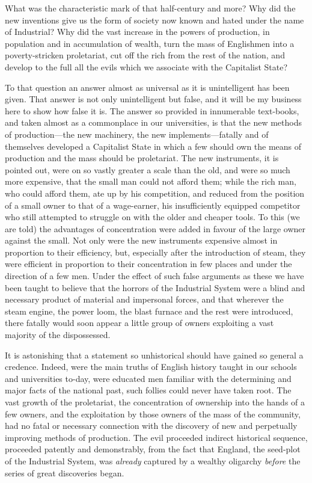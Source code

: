 \documentclass{book}
\begin{document}
What was the characteristic mark of that half-century and more? Why did the new inventions give us the form of society now known and hated under the name of Industrial? Why did the vast increase in the powers of production, in population and in accumulation of wealth, turn the mass of Englishmen into a poverty-stricken proletariat, cut off the rich from the rest of the nation, and develop to the full all the evils which we associate with the Capitalist State?

To that question an answer almost as universal as it is unintelligent has been given. That answer is not only unintelligent but false, and it will be my business here to show how false it is. The answer so provided in innumerable text-books, and taken almost as a commonplace in our universities, is that the new methods of production—the new machinery, the new implements—fatally and of themselves developed a Capitalist State in which a few should own the means of production and the mass should be proletariat. The new instruments, it is pointed out, were on so vastly greater a scale than the old, and were so much more expensive, that the small man could not afford them; while the rich man, who could afford them, ate up by his competition, and reduced from the position of a small owner to that of a wage-earner, his insufficiently equipped competitor who still attempted to struggle on with the older and cheaper tools. To this (we are told) the advantages of concentration were added in favour of the large owner against the small. Not only were the new instruments expensive almost in proportion to their efficiency, but, especially after the introduction of steam, they were efficient in proportion to their concentration in few places and under the direction of a few men. Under the effect of such false arguments as these we have been taught to believe that the horrors of the Industrial System were a blind and necessary product of material and impersonal forces, and that wherever the steam engine, the power loom, the blast furnace and the rest were introduced, there fatally would soon appear a little group of owners exploiting a vast majority of the dispossessed.

It is astonishing that a statement so unhistorical should have gained so general a credence. Indeed, were the main truths of English history taught in our schools and universities to-day, were educated men familiar with the determining and major facts of the national past, such follies could never have taken root. The vast growth of the proletariat, the concentration of ownership into the hands of a few owners, and the exploitation by those owners of the mass of the community, had no fatal or necessary connection with the discovery of new and perpetually improving methods of production. The evil proceeded indirect historical sequence, proceeded patently and demonstrably, from the fact that England, the seed-plot of the Industrial System, was \emph{already} captured by a wealthy oligarchy \emph{before} the series of great discoveries began.
\end{document}
